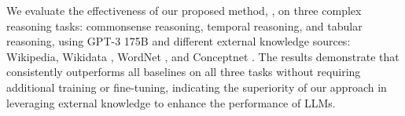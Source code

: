 We evaluate the effectiveness of our proposed method, \NAME{}, on three complex reasoning tasks: commonsense reasoning, temporal reasoning, and tabular reasoning, using GPT-3 175B \cite{brown2020language} and different external knowledge sources: Wikipedia, Wikidata \cite{vrandevcic2014wikidata}, WordNet \cite{miller1995wordnet}, and Conceptnet \cite{speer2017conceptnet}. The results demonstrate that \NAME{} consistently outperforms all baselines on all three tasks without requiring additional training or fine-tuning, indicating the superiority of our approach in leveraging external knowledge to enhance the performance of LLMs. 